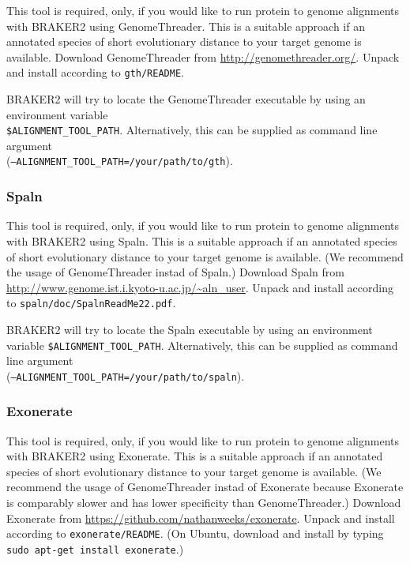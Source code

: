 \documentclass[a4paper,10pt]{report}
\begin{document}
This tool is required, only, if you would like to run protein to genome alignments with BRAKER2 using GenomeThreader. This is a suitable approach if an annotated species of short evolutionary distance to your target genome is available. Download GenomeThreader from \url{http://genomethreader.org/}. Unpack and install according to \texttt{gth/README}.

BRAKER2 will try to locate the GenomeThreader executable by using an environment variable\\\texttt{\$ALIGNMENT\_TOOL\_PATH}. Alternatively, this can be supplied as command line argument \\(\texttt{--ALIGNMENT\_TOOL\_PATH=/your/path/to/gth}).

\subsubsection{Spaln}

This tool is required, only, if you would like to run protein to genome alignments with BRAKER2 using Spaln. This is a suitable approach if an annotated species of short evolutionary distance to your target genome is available. (We recommend the usage of GenomeThreader instad of Spaln.) Download Spaln from \url{http://www.genome.ist.i.kyoto-u.ac.jp/~aln_user}. Unpack and install according to \texttt{spaln/doc/SpalnReadMe22.pdf}.

BRAKER2 will try to locate the Spaln executable by using an environment variable \texttt{\$ALIGNMENT\_TOOL\_PATH}. Alternatively, this can be supplied as command line argument \\(\texttt{--ALIGNMENT\_TOOL\_PATH=/your/path/to/spaln}).

\subsubsection{Exonerate}

This tool is required, only, if you would like to run protein to genome alignments with BRAKER2 using Exonerate. This is a suitable approach if an annotated species of short evolutionary distance to your target genome is available. (We recommend the usage of GenomeThreader instad of Exonerate because Exonerate is comparably slower and has lower specificity than GenomeThreader.) Download Exonerate from \url{https://github.com/nathanweeks/exonerate}. Unpack and install according to \texttt{exonerate/README}. (On Ubuntu, download and install by typing  \texttt{sudo apt-get install exonerate}.)
\end{document}
